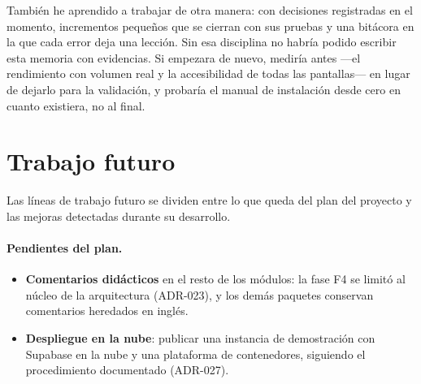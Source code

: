 También he aprendido a trabajar de otra manera: con decisiones registradas
en el momento, incrementos pequeños que se cierran con sus pruebas y una
bitácora en la que cada error deja una lección. Sin esa disciplina no habría
podido escribir esta memoria con evidencias. Si empezara de nuevo, mediría
antes ---el rendimiento con volumen real y la accesibilidad de todas las
pantallas--- en lugar de dejarlo para la validación, y probaría el manual de
instalación desde cero en cuanto existiera, no al final.

\section{Trabajo futuro}
\label{sec:concl-futuro}

Las líneas de trabajo futuro se dividen entre lo que queda del plan del
proyecto y las mejoras detectadas durante su desarrollo.

\paragraph{Pendientes del plan.}
\begin{itemize}
  \item \textbf{Comentarios didácticos} en el resto de los módulos: la fase
        F4 se limitó al núcleo de la arquitectura (ADR-023), y los demás
        paquetes conservan comentarios heredados en inglés.
  \item \textbf{Despliegue en la nube}: publicar una instancia de
        demostración con Supabase en la nube y una plataforma de
        contenedores, siguiendo el procedimiento documentado (ADR-027).
\end{itemize}

